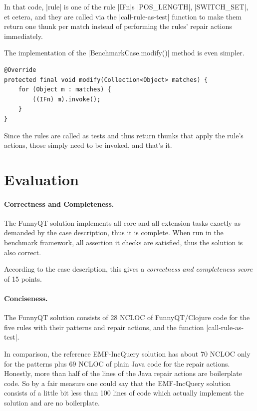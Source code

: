 \documentclass[submission]{eptcs}
\newcommand{\code}{\clojureinline}
\begin{document}
In that code, \code|rule| is one of the rule \code|IFn|s \code|POS_LENGTH|,
\code|SWITCH_SET|, et cetera, and they are called via the
\code|call-rule-as-test| function to make them return one thunk per match
instead of performing the rules' repair actions immediately.

The implementation of the \code|BenchmarkCase.modify()| method is even simpler.

\begin{verbatim}
@Override
protected final void modify(Collection<Object> matches) {
    for (Object m : matches) {
        ((IFn) m).invoke();
    }
}
\end{verbatim}

Since the rules are called as tests and thus return thunks that apply the
rule's actions, those simply need to be invoked, and that's it.



\section{Evaluation}
\label{sec:evaluation}

\paragraph{Correctness and Completeness.}

The FunnyQT solution implements all core and all extension tasks exactly as
demanded by the case description, thus it is complete.  When run in the
benchmark framework, all assertion it checks are satisfied, thus the solution
is also correct.

According to the case description, this gives a \emph{correctness and
  completeness score} of 15 points.

\paragraph{Conciseness.}

The FunnyQT solution consists of 28 NCLOC of FunnyQT/Clojure code for the five
rules with their patterns and repair actions, and the function
\code|call-rule-as-test|.

In comparison, the reference EMF-IncQuery solution has about 70 NCLOC only for
the patterns plus 69 NCLOC of plain Java code for the repair actions.
Honestly, more than half of the lines of the Java repair actions are
boilerplate code.  So by a fair measure one could say that the EMF-IncQuery
solution consists of a little bit less than 100 lines of code which actually
implement the solution and are no boilerplate.
\end{document}

